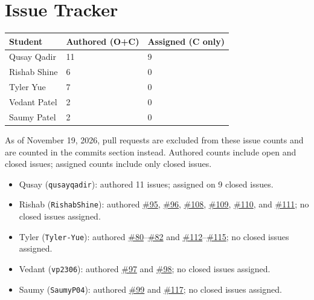 \documentclass{article}
\begin{document}
\section{Issue Tracker}

\begin{table}[H]
\centering
\begin{tabular}{lll}
\toprule
\textbf{Student} & \textbf{Authored (O+C)} & \textbf{Assigned (C only)}\\
\midrule
Qusay Qadir & 11 & 9 \\
Rishab Shine & 6 & 0 \\
Tyler Yue & 7 & 0 \\
Vedant Patel & 2 & 0 \\
Saumy Patel & 2 & 0 \\
\bottomrule
\end{tabular}
\end{table}

As of November 19, 2026, pull requests are excluded from these issue counts and
are counted in the commits section instead. Authored counts include open and
closed issues; assigned counts include only closed issues.

\begin{itemize}
  \item Qusay (\texttt{qusayqadir}): authored 11 issues; assigned on 9 closed
    issues.
  \item Rishab (\texttt{RishabShine}): authored
    \href{https://github.com/RishabShine/IDE3.0/issues/95}{\#95},
    \href{https://github.com/RishabShine/IDE3.0/issues/96}{\#96},
    \href{https://github.com/RishabShine/IDE3.0/issues/108}{\#108},
    \href{https://github.com/RishabShine/IDE3.0/issues/109}{\#109},
    \href{https://github.com/RishabShine/IDE3.0/issues/110}{\#110}, and
    \href{https://github.com/RishabShine/IDE3.0/issues/111}{\#111}; no closed
    issues assigned.
  \item Tyler (\texttt{Tyler-Yue}): authored
    \href{https://github.com/RishabShine/IDE3.0/issues/80}{\#80}--\href{https://github.com/RishabShine/IDE3.0/issues/82}{\#82}
    and
    \href{https://github.com/RishabShine/IDE3.0/issues/112}{\#112}--\href{https://github.com/RishabShine/IDE3.0/issues/115}{\#115};
    no closed issues assigned.
  \item Vedant (\texttt{vp2306}): authored
    \href{https://github.com/RishabShine/IDE3.0/issues/97}{\#97} and
    \href{https://github.com/RishabShine/IDE3.0/issues/98}{\#98}; no closed
    issues assigned.
  \item Saumy (\texttt{SaumyP04}): authored
    \href{https://github.com/RishabShine/IDE3.0/issues/99}{\#99} and
    \href{https://github.com/RishabShine/IDE3.0/issues/117}{\#117}; no closed
    issues assigned.
\end{itemize}
\end{document}
